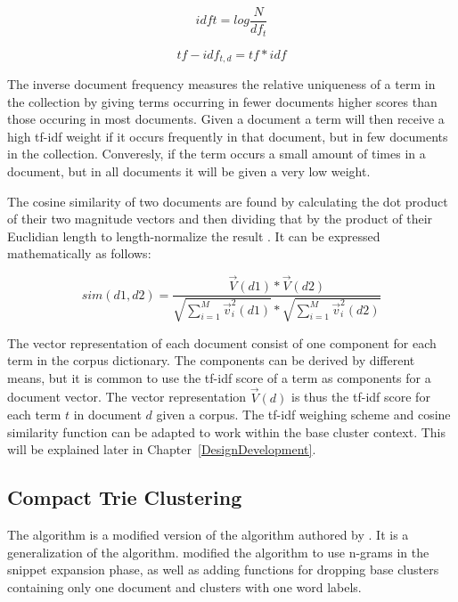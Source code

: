\begin{displaymath}
idf{t} = log \frac{N}{df_{t}} 
\end{displaymath}

\begin{displaymath}
tf-idf_{t,d} = tf * idf
\end{displaymath}

The inverse document frequency measures the relative uniqueness of a term in the collection by giving terms occurring in fewer documents higher scores than those occuring in most documents. Given a document a term will then receive a high tf-idf weight if it occurs frequently in that document, but in few documents in the collection. Converesly, if the term occurs a small amount of times in a document, but in all documents it will be given a very low weight.

The cosine similarity of two documents are found by calculating the dot product of their two magnitude vectors and then dividing that by the product of their Euclidian length to length-normalize the result \cite{Manning2009a}. It can be expressed mathematically as follows:

\begin{displaymath}
sim(d1, d2) = \frac{\vec{V}(d1) * \vec{V}(d2)}
{\sqrt{\sum_{i = 1}^M\vec{v}_{i}^2(d1)} * \sqrt{\sum_{i = 1}^M\vec{v}_{i}^2(d2)}}
\end{displaymath}

The vector representation of each document consist of one component for each term in the corpus dictionary. The components can be derived by different means, but it is common to use the tf-idf score of a term as components for a document vector. The vector representation \(\vec{V}(d)\) is thus the tf-idf score for each term \(t\) in document \(d\) given a corpus. The tf-idf weighing scheme and cosine similarity function can be adapted to work within the base cluster context. This will be explained later in Chapter~\ref{DesignDevelopment}.

\subsection{Compact Trie Clustering}
The \CTC algorithm is a modified version of the \STC algorithm authored by \cite{Moe2013}. It is a generalization of the \STC algorithm. \cite{Moe2013} modified the algorithm to use n-grams in the snippet expansion phase, as well as adding functions for dropping base clusters containing only one document and clusters with one word labels.

